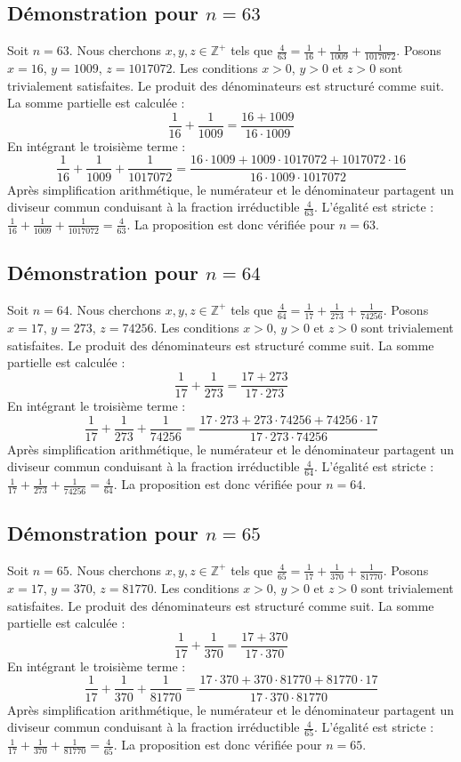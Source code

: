 \documentclass[11pt,a4paper]{article}
\begin{document}
\subsection{Démonstration pour $n = 63$}
Soit $n = 63$. Nous cherchons $x, y, z \in \mathbb{Z}^{+}$ tels que $\frac{4}{63} = \frac{1}{16} + \frac{1}{1009} + \frac{1}{1017072}$.
Posons $x = 16$, $y = 1009$, $z = 1017072$.
Les conditions $x > 0$, $y > 0$ et $z > 0$ sont trivialement satisfaites.
Le produit des dénominateurs est structuré comme suit. La somme partielle est calculée :
$$ \frac{1}{16} + \frac{1}{1009} = \frac{16+1009}{16 \cdot 1009} $$
En intégrant le troisième terme :
$$ \frac{1}{16} + \frac{1}{1009} + \frac{1}{1017072} = \frac{16 \cdot 1009 + 1009 \cdot 1017072 + 1017072 \cdot 16}{16 \cdot 1009 \cdot 1017072} $$
Après simplification arithmétique, le numérateur et le dénominateur partagent un diviseur commun conduisant à la fraction irréductible $\frac{4}{63}$.
L'égalité est stricte : $\frac{1}{16} + \frac{1}{1009} + \frac{1}{1017072} = \frac{4}{63}$.
La proposition est donc vérifiée pour $n = 63$.
\subsection{Démonstration pour $n = 64$}
Soit $n = 64$. Nous cherchons $x, y, z \in \mathbb{Z}^{+}$ tels que $\frac{4}{64} = \frac{1}{17} + \frac{1}{273} + \frac{1}{74256}$.
Posons $x = 17$, $y = 273$, $z = 74256$.
Les conditions $x > 0$, $y > 0$ et $z > 0$ sont trivialement satisfaites.
Le produit des dénominateurs est structuré comme suit. La somme partielle est calculée :
$$ \frac{1}{17} + \frac{1}{273} = \frac{17+273}{17 \cdot 273} $$
En intégrant le troisième terme :
$$ \frac{1}{17} + \frac{1}{273} + \frac{1}{74256} = \frac{17 \cdot 273 + 273 \cdot 74256 + 74256 \cdot 17}{17 \cdot 273 \cdot 74256} $$
Après simplification arithmétique, le numérateur et le dénominateur partagent un diviseur commun conduisant à la fraction irréductible $\frac{4}{64}$.
L'égalité est stricte : $\frac{1}{17} + \frac{1}{273} + \frac{1}{74256} = \frac{4}{64}$.
La proposition est donc vérifiée pour $n = 64$.
\subsection{Démonstration pour $n = 65$}
Soit $n = 65$. Nous cherchons $x, y, z \in \mathbb{Z}^{+}$ tels que $\frac{4}{65} = \frac{1}{17} + \frac{1}{370} + \frac{1}{81770}$.
Posons $x = 17$, $y = 370$, $z = 81770$.
Les conditions $x > 0$, $y > 0$ et $z > 0$ sont trivialement satisfaites.
Le produit des dénominateurs est structuré comme suit. La somme partielle est calculée :
$$ \frac{1}{17} + \frac{1}{370} = \frac{17+370}{17 \cdot 370} $$
En intégrant le troisième terme :
$$ \frac{1}{17} + \frac{1}{370} + \frac{1}{81770} = \frac{17 \cdot 370 + 370 \cdot 81770 + 81770 \cdot 17}{17 \cdot 370 \cdot 81770} $$
Après simplification arithmétique, le numérateur et le dénominateur partagent un diviseur commun conduisant à la fraction irréductible $\frac{4}{65}$.
L'égalité est stricte : $\frac{1}{17} + \frac{1}{370} + \frac{1}{81770} = \frac{4}{65}$.
La proposition est donc vérifiée pour $n = 65$.
\end{document}
